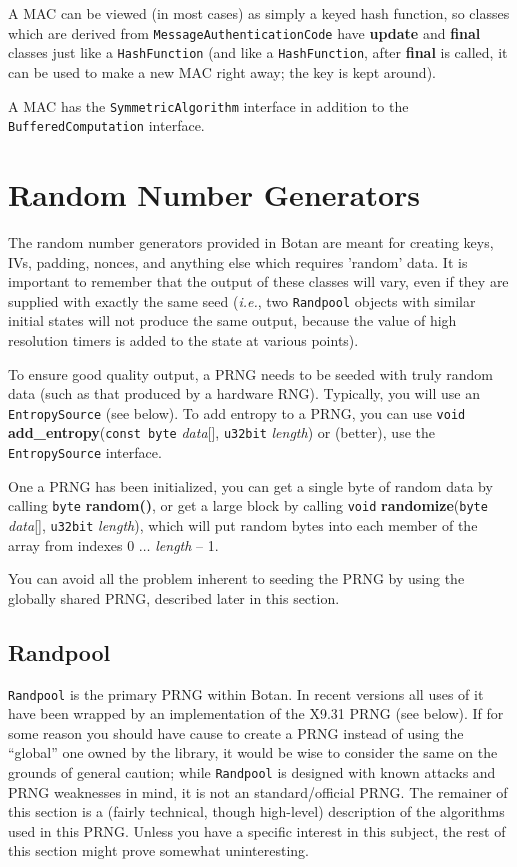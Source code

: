 \documentclass{article}
\newcommand{\function}[1]{\textbf{#1}}
\newcommand{\type}[1]{\texttt{#1}}
\renewcommand{\arg}[1]{\textsl{#1}}
\newcommand{\ie}[0]{\emph{i.e.}}
\begin{document}
A MAC can be viewed (in most cases) as simply a keyed hash function, so classes
which are derived from \type{MessageAuthenticationCode} have \function{update}
and \function{final} classes just like a \type{HashFunction} (and like a
\type{HashFunction}, after \function{final} is called, it can be used to make a
new MAC right away; the key is kept around).

A MAC has the \type{SymmetricAlgorithm} interface in addition to the
\type{BufferedComputation} interface.

\pagebreak
\section{Random Number Generators}

The random number generators provided in Botan are meant for creating keys,
IVs, padding, nonces, and anything else which requires 'random' data. It is
important to remember that the output of these classes will vary, even if they
are supplied with exactly the same seed (\ie, two \type{Randpool} objects with
similar initial states will not produce the same output, because the value of
high resolution timers is added to the state at various points).

To ensure good quality output, a PRNG needs to be seeded with truly random data
(such as that produced by a hardware RNG). Typically, you will use an
\type{EntropySource} (see below). To add entropy to a PRNG, you can use
\type{void} \function{add\_entropy}(\type{const byte} \arg{data}[],
\type{u32bit} \arg{length}) or (better), use the \type{EntropySource}
interface.

One a PRNG has been initialized, you can get a single byte of random data by
calling \type{byte} \function{random()}, or get a large block by calling
\type{void} \function{randomize}(\type{byte} \arg{data}[], \type{u32bit}
\arg{length}), which will put random bytes into each member of the array from
indexes 0 $\ldots$ \arg{length} -- 1.

You can avoid all the problem inherent to seeding the PRNG by using the
globally shared PRNG, described later in this section.

\subsection{Randpool}

\type{Randpool} is the primary PRNG within Botan. In recent versions all uses
of it have been wrapped by an implementation of the X9.31 PRNG (see below). If
for some reason you should have cause to create a PRNG instead of using the
``global'' one owned by the library, it would be wise to consider the same on
the grounds of general caution; while \type{Randpool} is designed with known
attacks and PRNG weaknesses in mind, it is not an standard/official PRNG. The
remainer of this section is a (fairly technical, though high-level) description
of the algorithms used in this PRNG. Unless you have a specific interest in
this subject, the rest of this section might prove somewhat uninteresting.
\end{document}
